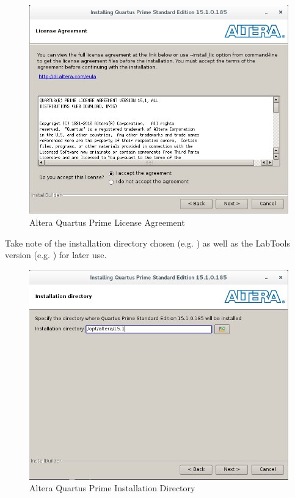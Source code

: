\begin{flushleft}
\begin{enumerate}
\begin{figure}[H]
	\centerline{\includegraphics[scale=0.5]{figures/altera_install_2}}
	\caption{Altera Quartus Prime License Agreement}
\end{figure}
Take note of the installation directory chosen (e.g. ) as well as the LabTools version (e.g. ) for later use.
\begin{figure}[H]
	\centerline{\includegraphics[scale=0.5]{figures/altera_install_3}}
	\caption{Altera Quartus Prime Installation Directory}
\end{figure}
\begin{figure}[H]

\end{figure}
\end{enumerate}
\end{flushleft}
